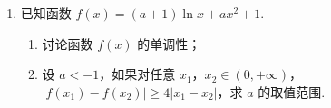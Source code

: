 \begin{description}
\begin{enumerate}[leftmargin=5pt]
\begin{enumerate}
\item 求椭圆 \(C\) 的离心率；
\item 如果 \(\left|AB\right| = \frac{15}{4}\)，求椭圆 \(C\) 的方程.
\end{enumerate}

        \item 已知函数 \( f(x) = (a + 1)\ln x + ax^2 + 1 \).

\begin{enumerate}
\item 讨论函数 \( f(x) \) 的单调性；
\item 设 \(a < -1\)，如果对任意 \(x_{1}\)，\(x_{2} \in (0, +\infty)\)，\(|f(x_{1}) - f(x_{2})| \geqslant 4|x_{1} - x_{2}|\)，求 \(a\) 的取值范围.
\end{enumerate}

    \end{enumerate}

\end{description}

